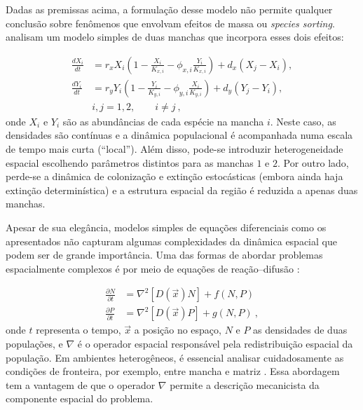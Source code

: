 \documentclass[12pt]{extarticle}
\begin{document}
Dadas as premissas acima, a formulação desse modelo não permite
qualquer conclusão sobre fenômenos que envolvam efeitos de massa ou \emph{species sorting}. 
\citet{amarasekare2001} analisam um modelo simples de duas
manchas que incorpora esses dois efeitos:

\begin{equation}
    \begin{aligned}
        \frac{dX_i}{dt} &= r_x X_i \left( 1 - \frac{X_i}{K_{x,i}} - \phi_{x,i}
        \frac{Y_i}{K_{x,i}} \right) + d_x (X_j - X_i), \\
        \frac{dY_i}{dt} &= r_y Y_i \left( 1 - \frac{Y_i}{K_{y,i}} - \phi_{y,i}
        \frac{X_i}{K_{y,i}} \right) + d_y (Y_j - Y_i), \\
        & i, j = 1, 2, \qquad i \neq j~,
    \end{aligned}
\end{equation}
%
onde $X_i$ e $Y_i$ são as abundâncias de cada espécie na mancha $i$. Neste
caso, as densidades são contínuas e a dinâmica populacional é acompanhada numa
escala de tempo mais curta (``local''). Além disso, pode-se introduzir
heterogeneidade espacial escolhendo parâmetros distintos para as manchas $1$ e
$2$. Por outro lado, perde-se a dinâmica de colonização e extinção
estocásticas (embora ainda haja extinção determinística) e a estrutura
espacial da região é reduzida a apenas duas manchas.

Apesar de sua elegância, modelos simples de equações diferenciais como os
apresentados não capturam algumas complexidades da dinâmica espacial que podem
ser de grande importância. Uma das formas de abordar problemas espacialmente
complexos é por meio de equações de reação--difusão \citep{skellam1951,murray2002}:

\begin{equation}
  \begin{aligned}
    \frac{\partial N}{\partial t} &= \nabla^2 \left[ D(\vec{x})N \right] + f(N,P)\\
    \frac{\partial P}{\partial t} &= \nabla^2 \left[ D(\vec{x})P \right] + g(N,P)~,
  \end{aligned}
\end{equation}
%
onde $t$ representa o tempo, $\vec{x}$ a posição no espaço, $N$ e $P$ as
densidades de duas populações, e $\nabla$ é o operador espacial responsável
pela redistribuição espacial da população. Em ambientes heterogêneos, é
essencial analisar cuidadosamente as condições de fronteira, por exemplo,
entre mancha e matriz \citep{turchin1998, ovaskainen2003}. Essa abordagem tem
a vantagem de que o operador $\nabla$ permite a descrição mecanicista da componente
espacial do problema.
\end{document}
